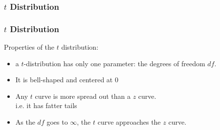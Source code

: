 \documentclass[handout]{beamer}
\newcommand{\blue}[1]{\textcolor{blue2}{#1}}
\begin{document}
\begin{frame}
\frametitle{$t$ Distribution}


\end{frame}


\begin{frame}
\frametitle{$t$ Distribution}
Properties of the $t$ distribution:

\begin{itemize}
\item a $t$-distribution has only one parameter: the \blue{degrees of freedom} $df$.
\pause \item It is bell-shaped and centered at 0
\pause \item Any $t$ curve is more spread out than a $z$ curve.\\
i.e. it has \blue{fatter tails}
\pause \item As the $df$ goes to $\infty$, the $t$ curve approaches the $z$ curve.
\end{itemize}

\end{frame}
\end{document}
